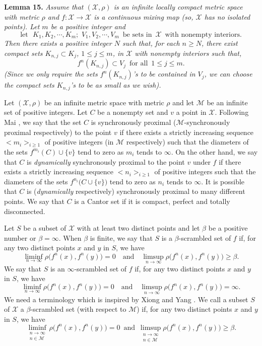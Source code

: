 \documentclass[12pt]{article}
\begin{document}
\noindent
{\bf Lemma 15.}
{\it Assume that $(\mathcal X, \rho)$ is an infinite locally compact metric space with metric $\rho$ and $f : \mathcal X \rightarrow \mathcal X$ is a continuous mixing map (so, $\mathcal X$ has no isolated points).  Let $m$ be a positive integer and 
$$
\text{let} \,\,\,\, K_1, K_2, \cdots, K_m; \,\, V_1, V_2, \cdots, V_m \,\,\, \text{be sets in} \,\,\, \mathcal X \,\,\, \text{with nonempty interiors}.
$$
Then there exists a positive integer $N$ such that, for each $n \ge N$, there exist compact sets $K_{n,j} \subset K_j$, $1 \le j \le m$, in $\mathcal X$ with nonempty interiors such that, 
$$
f^n(K_{n,j}) \subset V_j \,\,\, \text{for all} \,\,\, 1 \le j \le m.
$$
(Since we only require the sets $f^n(K_{n,j})$'s to be contained in $V_j$, we can choose the compact sets $K_{n,j}$'s to be as small as we wish).}

Let $(\mathcal X, \rho)$ be an infinite metric space with metric $\rho$ and let $\mathcal M$ be an infinite set of positive integers.  Let $C$ be a nonempty set and $v$ a point in $\mathcal X$.  Following Mai {\bf\cite{mai}}, we say that the set $C$ is synchronously proximal ($\mathcal M$-synchronously proximal respectively) to the point $v$ if there exists a strictly increasing sequence $< m_i >_{i \ge 1}$ of positive integers (in $\mathcal M$ respectively) such that the diameters of the sets $f^{m_i}(C) \cup \{ v \}$ tend to zero as $m_i$ tends to $\infty$.  On the other hand, we say that $C$ is {\it dynamically} synchronously proximal to the point $v$ under $f$ if there exists a strictly increasing sequence $< n_i >_{i \ge 1}$ of positive integers such that the diameters of the sets $f^{n_i}\big(C \cup \{ v \}\big)$ tend to zero as $n_i$ tends to $\infty$.  It is possible that $C$ is ({\it dynamically} respectively) synchronously proximal to many different points.  We say that $C$ is a Cantor set if it is compact, perfect and totally disconnected.

Let $S$ be a subset of $\mathcal X$ with at least two distinct points and let $\beta$ be a positive number or $\beta = \infty$.  When $\beta$ is finite, we say that $S$ is a $\beta$-scrambled set of $f$ if, for any two distinct points $x$ and $y$ in $S$, we have 
$$\liminf_{n \to \infty} \rho\big(f^n(x), f^n(y)\big) = 0 \quad \text{and} \quad \limsup_{n \to \infty} \rho\big(f^n(x), f^n(y)\big) \ge \beta.
$$  
We say that $S$ is an $\infty$-scrambled set of $f$ if, for any two distinct points $x$ and $y$ in $S$, we have 
$$\liminf_{n \to \infty} \rho\big(f^n(x), f^n(y)\big) = 0 \quad \text{and} \quad \limsup_{n \to \infty} \rho\big(f^n(x), f^n(y)\big) = \infty.
$$
\indent We need a terminology which is inspired by Xiong and Yang {\bf\cite{xiong}}.  We call a subset $S$ of $\mathcal X$ a $\beta$-scrambled set (with respect to $\mathcal M$) if, for any two distinct points $x$ and $y$ in $S$, we have
$$
\liminf_{\substack{n \to \infty \\ n \in \mathcal M}} \rho\big(f^n(x), f^n(y)\big) = 0 \,\,\, \text{and} \,\,\, \limsup_{\substack{n \to \infty \\ n \in \mathcal M}}  \rho\big(f^n(x), f^n(y)\big) \ge \beta.
$$
\end{document}
